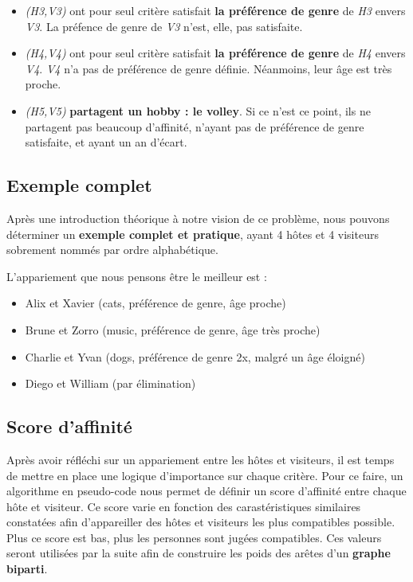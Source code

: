 \documentclass{mytex}
\begin{document}
\begin{itemize}
	\item \emph{(H3,V3)} ont pour seul critère satisfait \textbf{la préférence de genre} de \emph{H3} envers \emph{V3}. La préfence de genre de \emph{V3} n'est, elle, pas satisfaite.
	\item \emph{(H4,V4)} ont pour seul critère satisfait \textbf{la préférence de genre} de \emph{H4} envers \emph{V4}. \emph{V4} n'a pas de préférence de genre définie. Néanmoins, leur âge est très proche.
	\item \emph{(H5,V5)} \textbf{partagent un hobby : le volley}. Si ce n'est ce point, ils ne partagent pas beaucoup d'affinité, n'ayant pas de préférence de genre satisfaite, et ayant un an d'écart.
\end{itemize}

\subsection{Exemple complet}

Après une introduction théorique à notre vision de ce problème, nous pouvons déterminer un \textbf{exemple complet et pratique}, ayant 4 hôtes et 4 visiteurs sobrement nommés par ordre alphabétique.


L'appariement que nous pensons être le meilleur est :

\begin{itemize}
	\item Alix et Xavier (cats, préférence de genre, âge proche)
	\item Brune et Zorro (music, préférence de genre, âge très proche)
	\item Charlie et Yvan (dogs, préférence de genre 2x, malgré un âge éloigné)
	\item Diego et William (par élimination)
\end{itemize}

\subsection{Score d'affinité}

Après avoir réfléchi sur un appariement entre les hôtes et visiteurs, il est temps de mettre en place une logique d'importance sur chaque critère. Pour ce faire, un algorithme en pseudo-code nous permet de définir un score d'affinité entre chaque hôte et visiteur. Ce score varie en fonction des carastéristiques similaires constatées afin d'appareiller des hôtes et visiteurs les plus compatibles possible. Plus ce score est bas, plus les personnes sont jugées compatibles.
Ces valeurs seront utilisées par la suite afin de construire les poids des arêtes d'un \textbf{graphe biparti}.
\end{document}
